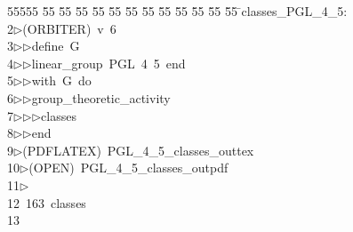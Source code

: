 %
%
\begin{tabbing}
55555 \= 55 \= 55 \= 55 \= 55 \= 55 \= 55 \= 55 \= 55 \= 55 \= 55 \= 55 \= 55 \= \>classes\_PGL\_4\_5:\\[0pt]
2\>$\triangleright$\>(ORBITER)\ v\ 6\ \\[0pt]
3\>$\triangleright$\>$\triangleright$\>define\ G\ \\[0pt]
4\>$\triangleright$\>$\triangleright$\>linear\_group\ PGL\ 4\ 5\ end\ \\[0pt]
5\>$\triangleright$\>$\triangleright$\>with\ G\ do\ \\[0pt]
6\>$\triangleright$\>$\triangleright$\>group\_theoretic\_activity\ \\[0pt]
7\>$\triangleright$\>$\triangleright$\>$\triangleright$\>classes\ \\[0pt]
8\>$\triangleright$\>$\triangleright$\>end\\[0pt]
9\>$\triangleright$\>(PDFLATEX)\ PGL\_4\_5\_classes\_outtex\\[0pt]
10\>$\triangleright$\>(OPEN)\ PGL\_4\_5\_classes\_outpdf\\[0pt]
11\>$\triangleright$\>\\[0pt]
12\>\ 163\ classes\\[0pt]
13\>\end{tabbing}
